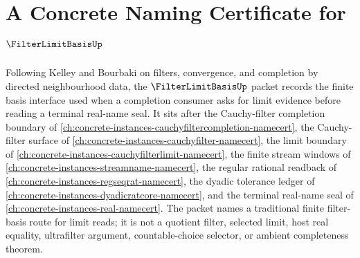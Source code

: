 \chapter{A Concrete Naming Certificate for $\FilterLimitBasisUp$}
\label{ch:concrete-instances-filterlimitbasis-namecert}

Following Kelley and Bourbaki on filters, convergence, and completion by directed neighbourhood data, the $\FilterLimitBasisUp$ packet records the finite basis interface used when a completion consumer asks for limit evidence before reading a terminal real-name seal. It sits after the Cauchy-filter completion boundary of \autoref{ch:concrete-instances-cauchyfiltercompletion-namecert}, the Cauchy-filter surface of \autoref{ch:concrete-instances-cauchyfilter-namecert}, the limit boundary of \autoref{ch:concrete-instances-cauchyfilterlimit-namecert}, the finite stream windows of \autoref{ch:concrete-instances-streamname-namecert}, the regular rational readback of \autoref{ch:concrete-instances-regseqrat-namecert}, the dyadic tolerance ledger of \autoref{ch:concrete-instances-dyadicratcore-namecert}, and the terminal real-name seal of \autoref{ch:concrete-instances-real-namecert}. The packet names a traditional finite filter-basis route for limit reads; it is not a quotient filter, selected limit, host real equality, ultrafilter argument, countable-choice selector, or ambient completeness theorem.


